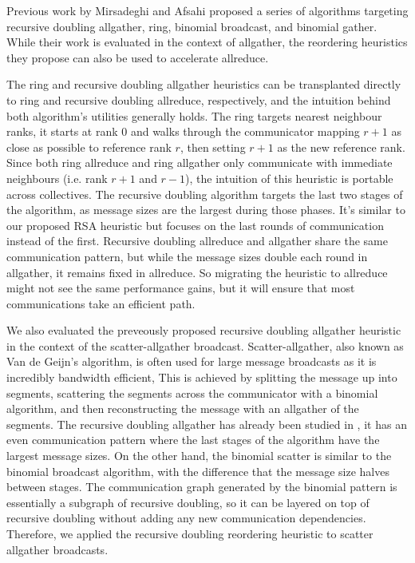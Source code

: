 Previous work by Mirsadeghi and Afsahi \cite{Mirsadeghi2016TopoAwareCollRR} proposed a series of algorithms targeting recursive doubling allgather, ring, binomial broadcast, and binomial gather. 
While their work is evaluated in the context of allgather, the reordering heuristics they propose can also be used to accelerate allreduce. 

The ring and recursive doubling allgather heuristics can be transplanted directly to ring and recursive doubling allreduce, respectively, and the intuition behind both algorithm's utilities generally holds. 
The ring targets nearest neighbour ranks, it starts at rank 0 and walks through the communicator mapping $r+1$ as close as possible to reference rank $r$, then setting $r+1$ as the new reference rank.
Since both ring allreduce and ring allgather only communicate with immediate neighbours (i.e. rank $r+1$ and $r-1$), the intuition of this heuristic is portable across collectives.
The recursive doubling algorithm targets the last two stages of the algorithm, as message sizes are the largest during those phases. 
It's similar to our proposed RSA heuristic but focuses on the last rounds of communication instead of the first. 
Recursive doubling allreduce and allgather share the same communication pattern, but while the message sizes double each round in allgather,  it remains fixed in allreduce.
So migrating the heuristic to allreduce might not see the same performance gains, but it will ensure that most communications take an efficient path.

We also evaluated the preveously proposed recursive doubling allgather heuristic in the context of the scatter-allgather broadcast.
Scatter-allgather, also known as Van de Geijn's algorithm, is often used for large message broadcasts as it is incredibly bandwidth efficient, 
This is achieved by splitting the message up into segments, scattering the segments across the communicator with a binomial algorithm, and then reconstructing the message with an allgather of the segments.
The recursive doubling allgather has already been studied in \cite{Mirsadeghi2016TopoAwareCollRR}, it has an even communication pattern where the last stages of the algorithm have the largest message sizes.
On the other hand, the binomial scatter is similar to the binomial broadcast algorithm, with the difference that the message size halves between stages. 
The communication graph generated by the binomial pattern is essentially a subgraph of recursive doubling, so it can be layered on top of recursive doubling without adding any new communication dependencies. 
Therefore, we applied the recursive doubling reordering heuristic to scatter allgather broadcasts.


